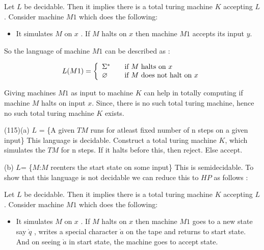 \documentclass[addpoints,12pt]{exam}
\begin{document}
\begin{questions}
      Let $L$ be decidable. Then it implies there is a total turing machine $K$ accepting $L$. \newline
	 Consider machine $M1$ which does the following:
	\begin{itemize}
	\item 
	It simulates $M$ on $x$ . If $M$ halts on $x$ then machine $M1$ accepts its input $y$.
  
	\end{itemize}
	So the language of machine $M1$ can be described as : 
  
	\[
	  L(M1) = \left\{ 
	\begin{array}{l l}
	  \Sigma^\ast & \quad \text{if $M$ halts on $x$}\\
	  \varnothing & \quad \text{if $M$ does not halt on $x$}\\
	\end{array} \right.
      \]

      Giving machines $M1$ as input to machine $K$ can help in totally computing if machine $M$ halts on input $x$. Since, there is no such total turing machine, hence no such total turing machine $K$ exists.
      \newline
      
      (115)(a) \quad $L$ = \{A given $TM$ runs for atleast fixed number of n steps on a given input\} \newline
      This language is decidable. Construct a total turing machine $K$, which simulates the $TM$ for n steps. If it halts before this, then reject. Else accept.
      \newline
      
      (b) \quad $L$= \{$M$:$M$ reenters the start state on some input\} \newline
      This is semidecidable. To show that this language is not decidable we can reduce this to $HP$ as follows : \newline
	
	 Let $L$ be decidable. Then it implies there is a total turing machine $K$ accepting $L$. \newline
	 Consider machine $M1$ which does the following:
	\begin{itemize}
	\item 
	It simulates $M$ on $x$ . If $M$ halts on $x$ then machine $M1$ goes to a new state say $\grave{q}$ , writes a special character $\grave{a}$ on the tape
	and returns to start state. And on seeing $\grave{a}$ in start state, the machine goes to accept state.
  

\end{itemize}
\end{questions}
\end{document}
